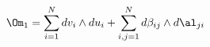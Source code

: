 \begin{equation}
\Om_1= \sum_{i=1}^N dv_i \wedge du_i + \sum_{i,j=1}^N
d\beta_{ij}\wedge d\al_{ji}  
\label{form-red}
\end{equation}

